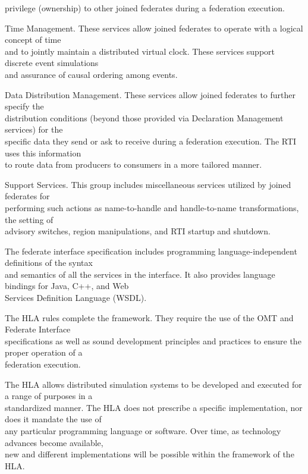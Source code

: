 \begin{hlalist}
    privilege (ownership) to other joined federates during a federation execution.
    \item Time Management. These services allow joined federates to operate with a logical concept of time\\
    and to jointly maintain a distributed virtual clock. These services support discrete event simulations\\
    and assurance of causal ordering among events.
    \item Data Distribution Management. These services allow joined federates to further specify the\\
    distribution conditions (beyond those provided via Declaration Management services) for the\\
    specific data they send or ask to receive during a federation execution. The RTI uses this information\\
    to route data from producers to consumers in a more tailored manner.
    \item Support Services. This group includes miscellaneous services utilized by joined federates for\\
    performing such actions as name-to-handle and handle-to-name transformations, the setting of\\
    advisory switches, region manipulations, and RTI startup and shutdown.
\end{hlalist}

\newpage

The federate interface specification includes programming language-independent definitions of the syntax\\
and semantics of all the services in the interface. It also provides language bindings for Java, C++, and Web\\
Services Definition Language (WSDL).

The HLA rules complete the framework. They require the use of the OMT and Federate Interface\\
specifications as well as sound development principles and practices to ensure the proper operation of a\\
federation execution.

The HLA allows distributed simulation systems to be developed and executed for a range of purposes in a\\
standardized manner. The HLA does not prescribe a specific implementation, nor does it mandate the use of\\
any particular programming language or software. Over time, as technology advances become available,\\
new and different implementations will be possible within the framework of the HLA.

